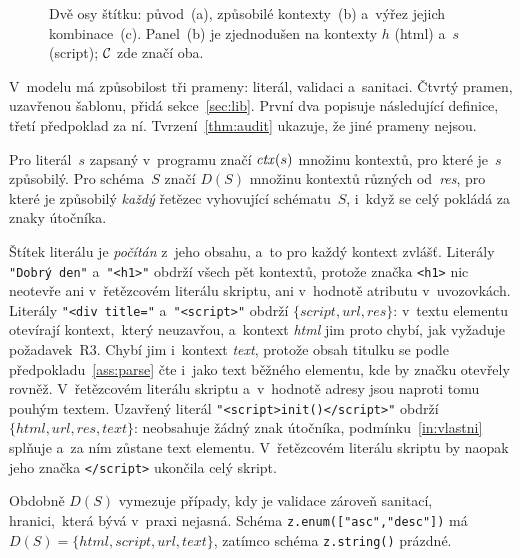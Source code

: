 \begin{figure}[htbp]
    \centering
    \caption[Dvě osy štítku a~výřez jejich kombinace]{Dvě osy štítku: původ~(a), způsobilé kontexty~(b) a~výřez jejich kombinace~(c). Panel~(b) je zjednodušen na kontexty $h$ (html) a~$s$ (script); $\mathcal{C}$ zde značí oba.}
    \label{fig:mrizka-soucin}
\end{figure}

V~modelu má způsobilost tři prameny: literál, validaci a~sanitaci. Čtvrtý pramen, uzavřenou šablonu, přidá sekce~\ref{sec:lib}. První dva popisuje následující definice, třetí předpoklad za ní. Tvrzení~\ref{thm:audit} ukazuje, že jiné prameny nejsou.

\begin{definice}
\label{def:prameny}
Pro literál~$s$ zapsaný v~programu značí $\mathit{ctx}(s)$ množinu kontextů, pro které je~$s$ způsobilý. Pro schéma~$S$ značí $D(S)$ množinu kontextů různých od~\emph{res}, pro které je způsobilý \emph{každý} řetězec vyhovující schématu~$S$, i~když se celý pokládá za znaky útočníka.
\end{definice}

Štítek literálu je \emph{počítán} z~jeho obsahu, a~to pro každý kontext zvlášť. Literály \verb|"Dobrý den"| a~\verb|"<h1>"| obdrží všech pět kontextů, protože značka \texttt{<h1>} nic neotevře ani v~řetězcovém literálu skriptu, ani v~hodnotě atributu v~uvozovkách. Literály \verb|"<div title="| a~\verb|"<script>"| obdrží $\{\mathit{script}, \mathit{url}, \mathit{res}\}$: v~textu elementu otevírají kontext,~který neuzavřou, a~kontext \emph{html} jim proto chybí, jak vyžaduje požadavek~R3. Chybí jim i~kontext \emph{text}, protože obsah titulku se podle předpokladu~\ref{ass:parse} čte i~jako text běžného elementu, kde by značku otevřely rovněž. V~řetězcovém literálu skriptu a~v~hodnotě adresy jsou naproti tomu pouhým textem. Uzavřený literál \verb|"<script>init()</script>"| obdrží $\{\mathit{html}, \mathit{url}, \mathit{res}, \mathit{text}\}$: neobsahuje žádný znak útočníka, podmínku~\eqref{in:vlastni} splňuje a~za ním zůstane text elementu. V~řetězcovém literálu skriptu by naopak jeho značka \verb|</script>| ukončila celý skript.

Obdobně $D(S)$ vymezuje případy, kdy je validace zároveň sanitací, hranici,~která bývá v~praxi nejasná. Schéma \verb|z.enum(["asc","desc"])| má $D(S) = \{\mathit{html}, \mathit{script}, \mathit{url}, \mathit{text}\}$, zatímco schéma \verb|z.string()| prázdné.

